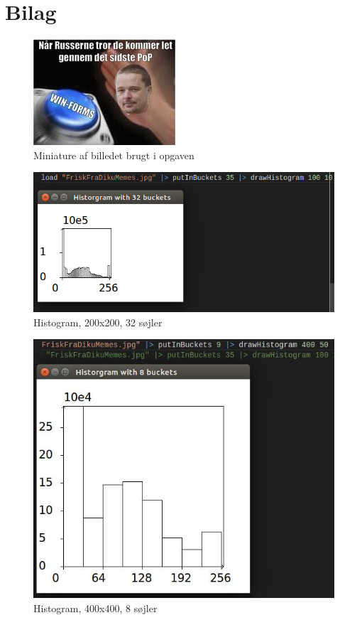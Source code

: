 \documentclass[12pt, a4paper, hidelinks]{article}
\begin{document}
\section{Bilag}

\begin{figure}[!ht]
  \centering
  \includegraphics{FriskFraDikuMemes_mini}
  \caption{Miniature af billedet brugt i opgaven}
\end{figure}

\begin{figure}[!ht]
  \centering
  \includegraphics{200x200_32Buckets}
  \caption{Histogram, 200x200, 32 søjler}
\end{figure}

\begin{figure}[!ht]
  \centering
  \includegraphics{400x400_8Buckets}
  \caption{Histogram, 400x400, 8 søjler}
\end{figure}
\end{document}
